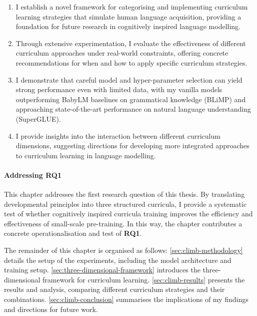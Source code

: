 \begin{enumerate}
    \item I establish a novel framework for categorising and implementing curriculum learning strategies that simulate human language acquisition, providing a foundation for future research in cognitively inspired language modelling.
    
    \item Through extensive experimentation, I evaluate the effectiveness of different curriculum approaches under real-world constraints, offering concrete recommendations for when and how to apply specific curriculum strategies.
    
    \item I demonstrate that careful model and hyper-parameter selection can yield strong performance even with limited data, with my vanilla models outperforming BabyLM baselines on grammatical knowledge (BLiMP) and approaching state-of-the-art performance on natural language understanding (SuperGLUE).
    
    \item I provide insights into the interaction between different curriculum dimensions, suggesting directions for developing more integrated approaches to curriculum learning in language modelling.
\end{enumerate}

\paragraph{Addressing RQ1} This chapter addresses the first research question of this thesis. By translating developmental principles into three structured curricula, I provide a systematic test of whether cognitively inspired curricula training improves the efficiency and effectiveness of small-scale pre-training. In this way, the chapter contributes a concrete operationalisation and test of \textbf{RQ1}. 

\vspace{1em}

The remainder of this chapter is organised as follows: \cref{sec:climb-methodology} details the setup of the experiments, including the model architecture and training setup. \cref{sec:three-dimensional-framework} introduces the three-dimensional framework for curriculum learning. \cref{sec:climb-results} presents the results and analysis, comparing different curriculum strategies and their combinations. \cref{sec:climb-conclusion} summarises the implications of my findings and directions for future work.


